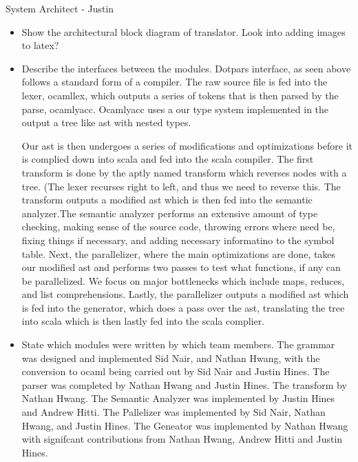 System Architect - Justin
\begin{itemize}
\item Show the architectural block diagram of translator.
Look into adding images to latex?

\item Describe the interfaces between the modules.
Dotpars interface, as seen above follows a standard form of a compiler. The raw
source file is fed into the lexer, ocamllex, which outputs a series of tokens that is then
parsed by the parse, ocamlyacc.  Ocamlyacc uses a our type system implemented in
the output a tree like ast with nested types. 

Our ast is then undergoes a series of modifications and optimizations before it
is complied down into scala and fed into the scala compiler.  The first transform
is done by the aptly named transform which reverses nodes with a tree.  (The lexer
recurses right to left, and thus we need to reverse this.  The transform outputs
a modified ast which is then fed into the semantic analyzer.The semantic analyzer 
performs an extensive amount of type checking, making sense of the source code, 
throwing errors where need be, fixing things if necessary, and adding necessary 
informatino to the symbol table.  Next, the parallelizer, where the main optimizations
are done, takes our modified ast and performs two passes to test what functions, 
if any can be parallelized. We focus on major bottlenecks which include maps, reduces,
and list comprehensions. Lastly, the parallelizer outputs a modified ast which is fed
into the generator, which does a pass over the ast, translating the tree into 
scala which is then lastly fed into the scala complier.

\item State which modules were written by which team members.
The grammar was designed and implemented Sid Nair, and Nathan Hwang, with the
conversion to ocaml being carried out by Sid Nair and Justin Hines.  The parser was
completed by Nathan Hwang and Justin Hines.  The transform by Nathan Hwang.  The
Semantic Analyzer was implemented by Justin Hines and Andrew Hitti.  The Pallelizer was
implemented by Sid Nair, Nathan Hwang, and Justin Hines. The Geneator was 
implemented by Nathan Hwang with signifcant contributions from Nathan Hwang, 
Andrew Hitti and Justin Hines.

\end{itemize}




